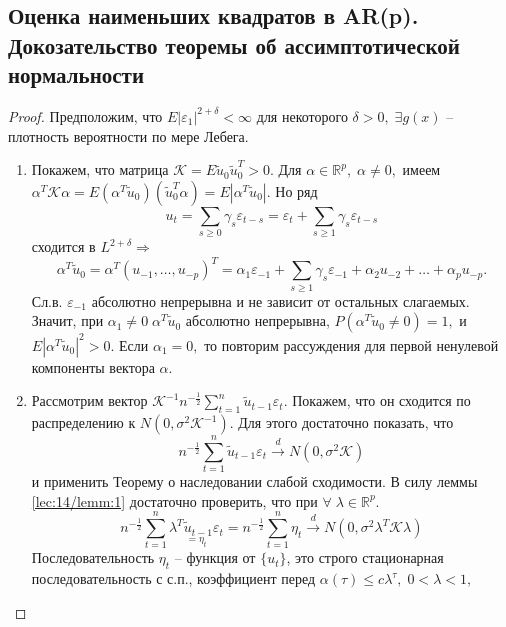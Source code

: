 \subsection*{Оценка наименьших квадратов в AR(p). Докозательство теоремы об ассимптотической нормальности}\label{lec:14/subsec:2}
\begin{proof}
    Предположим, что $E|\varepsilon_1|^{2 + \delta} < \infty$ для некоторого $\delta > 0, \; \exists g(x)$ -- плотность вероятности по мере Лебега.
    \begin{enumerate}
            \item Покажем, что матрица $\mathcal{K} = E\tilde{u}_{0}\tilde{u}_{0}^T > 0.$ Для $\alpha \in \mathbb{R}^p, \; \alpha \neq 0,$ имеем $\alpha^T \mathcal{K} \alpha = E(\alpha^T\tilde{u}_{0})(\tilde{u}_{0}^T\alpha) = E|\alpha^T \tilde{u}_{0}|.$ Но ряд
            $$u_t = \sum\limits_{s \geq 0} \gamma_s \varepsilon_{t - s} = \varepsilon_t + \sum\limits_{s \geq 1} \gamma_s \varepsilon_{t - s}$$
            сходится в $L^{2 + \delta} \Longrightarrow$ 
            $$\alpha^T \tilde{u}_{0} = \alpha^T (u_{-1}, \ldots, u_{-p})^T = \alpha_1 \varepsilon_{-1} + \sum\limits_{s \geq 1} \gamma_s \varepsilon_{-1} + \alpha_2 u_{-2} + \ldots + \alpha_p u_{-p}.$$ 
            Сл.в. $\varepsilon_{-1}$ абсолютно непрерывна и не зависит от остальных слагаемых. Значит, при $\alpha_1 \neq 0 \; \alpha^T \tilde{u}_{0}$ абсолютно непрерывна, $P(\alpha^T \tilde{u}_{0} \neq 0) = 1, $ и $E|\alpha^T \tilde{u}_{0}|^2 > 0.$ Если $\alpha_1 = 0,$ то повторим рассуждения для первой ненулевой компоненты вектора $\alpha$.
            \item Рассмотрим вектор $\mathcal{K}^{-1} n^{-\frac{1}{2}} \sum\limits_{t = 1}^n \tilde{u}_{t - 1}\varepsilon_t.$ Покажем, что он сходится по распределению к $N(0, \sigma^2 \mathcal{K}^{-1}).$ Для этого достаточно показать, что 
            $$n^{-\frac{1}{2}} \sum\limits_{t = 1}^n \tilde{u}_{t - 1}\varepsilon_t \stackrel{d}{\to} N(0, \sigma^2 \mathcal{K})$$
            и применить Теорему о наследовании слабой сходимости. В силу леммы \ref{lec:14/lemm:1} достаточно проверить, что при $\forall \; \lambda \in \mathbb{R}^p.$
            $$n^{-\frac{1}{2}} \sum\limits_{t = 1}^n \underset{= \eta_t}{\lambda^T \tilde{u}_{t - 1} \varepsilon_t} = n^{-\frac{1}{2}} \sum\limits_{t = 1}^n \eta_t \stackrel{d}{\to} N(0, \sigma^2 \lambda^T \mathcal{K} \lambda)$$
            Последовательность $\eta_t$ -- функция от $\lbrace u_t \rbrace$, это строго стационарная последовательность с с.п., коэффициент перед $\alpha(\tau) \leq c\lambda^{\tau}, \; 0 < \lambda < 1,$

\end{enumerate}
\end{proof}
